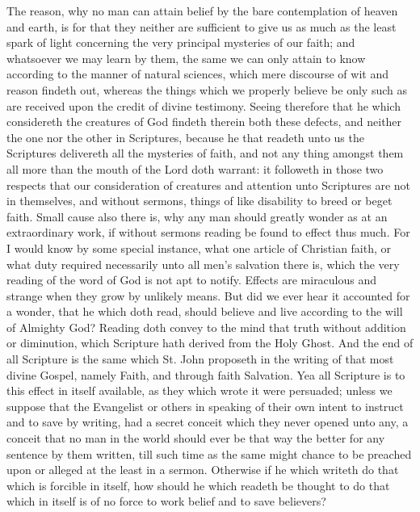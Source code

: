 The reason, why no man can attain belief by the bare contemplation of heaven and earth, is for that they neither are sufficient to give us as much as the least spark of light concerning the very principal mysteries of our faith; and whatsoever we may learn by them, the same we can only attain to know according to the manner of natural sciences, which mere discourse of wit and reason findeth out, whereas the things which we properly believe be only such as are received upon the credit of divine testimony. Seeing therefore that he which considereth the creatures of God findeth therein both these defects, and neither the one nor the other in Scriptures, because he that readeth unto us the Scriptures delivereth all the mysteries of faith, and not any thing amongst them all more than the mouth of the Lord doth warrant: it followeth in those two respects that our consideration of creatures and attention unto Scriptures are not in themselves, and without sermons, things of like disability to breed or beget faith.
Small cause also there is, why any man should greatly wonder as at an extraordinary work, if without sermons reading be found to effect thus much. For I would know by some special instance, what one article of Christian faith, or what duty required necessarily unto all men’s salvation there is, which the very reading of the word of God is not apt to notify. Effects are miraculous and strange when they grow by unlikely means. But did we ever hear it accounted for a wonder, that he which doth read, should believe and live according to the will of Almighty God? Reading doth convey to the  mind that truth without addition or diminution, which Scripture hath derived from the Holy Ghost. And the end of all Scripture is the same which St. John proposeth in the writing of that most divine Gospel, namely Faith, and through faith Salvation. Yea all Scripture is to this effect in itself available, as they which wrote it were persuaded; unless we suppose that the Evangelist or others in speaking of their own intent to instruct and to save by writing, had a secret conceit which they never opened unto any, a conceit that no man in the world should ever be that way the better for any sentence by them written, till such time as the same might chance to be preached upon or alleged at the least in a sermon. Otherwise if he which writeth do that which is forcible in itself, how should he which readeth be thought to do that which in itself is of no force to work belief and to save believers?
